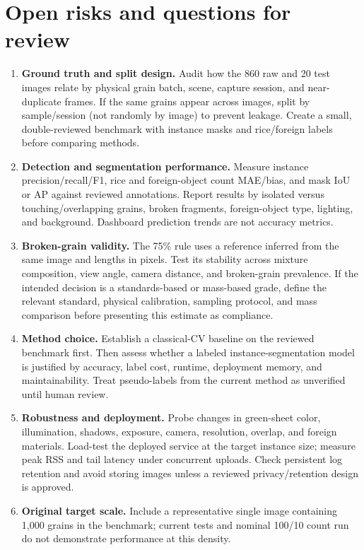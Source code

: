 \documentclass[10pt,a4paper]{article}
\begin{document}
\section{Open risks and questions for review}
\begin{enumerate}
  \item \textbf{Ground truth and split design.} Audit how the 860 raw and 20 test images relate by physical grain batch, scene, capture session, and near-duplicate frames. If the same grains appear across images, split by sample/session (not randomly by image) to prevent leakage. Create a small, double-reviewed benchmark with instance masks and rice/foreign labels before comparing methods.
  \item \textbf{Detection and segmentation performance.} Measure instance precision/recall/F1, rice and foreign-object count MAE/bias, and mask IoU or AP against reviewed annotations. Report results by isolated versus touching/overlapping grains, broken fragments, foreign-object type, lighting, and background. Dashboard prediction trends are not accuracy metrics.
  \item \textbf{Broken-grain validity.} The 75\% rule uses a reference inferred from the same image and lengths in pixels. Test its stability across mixture composition, view angle, camera distance, and broken-grain prevalence. If the intended decision is a standards-based or mass-based grade, define the relevant standard, physical calibration, sampling protocol, and mass comparison before presenting this estimate as compliance.
  \item \textbf{Method choice.} Establish a classical-CV baseline on the reviewed benchmark first. Then assess whether a labeled instance-segmentation model is justified by accuracy, label cost, runtime, deployment memory, and maintainability. Treat pseudo-labels from the current method as unverified until human review.
  \item \textbf{Robustness and deployment.} Probe changes in green-sheet color, illumination, shadows, exposure, camera, resolution, overlap, and foreign materials. Load-test the deployed service at the target instance size; measure peak RSS and tail latency under concurrent uploads. Check persistent log retention and avoid storing images unless a reviewed privacy/retention design is approved.
  \item \textbf{Original target scale.} Include a representative single image containing 1,000 grains in the benchmark; current tests and nominal 100/10 count run do not demonstrate performance at this density.
\end{enumerate}
\end{document}
